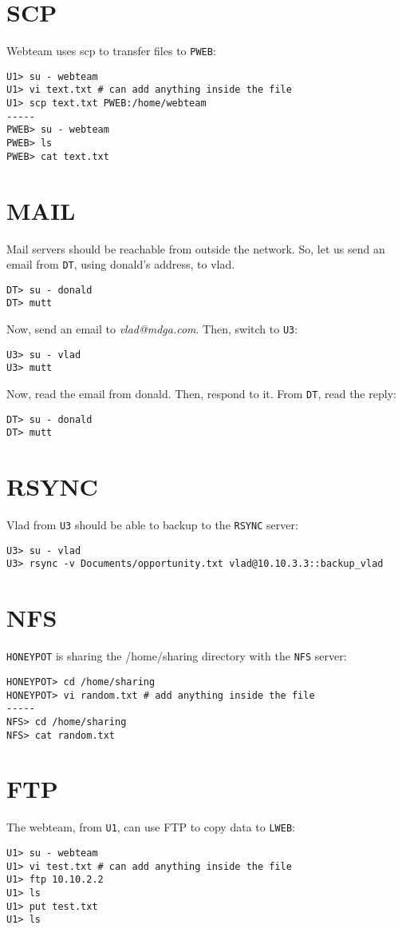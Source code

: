 \documentclass[a4paper, 11pt, oneside]{article}
\begin{document}
\section{SCP}
\noindent Webteam uses scp to transfer files to \texttt{PWEB}:
\begin{lstlisting}
U1> su - webteam
U1> vi text.txt # can add anything inside the file
U1> scp text.txt PWEB:/home/webteam
-----
PWEB> su - webteam
PWEB> ls
PWEB> cat text.txt
\end{lstlisting}

\section{MAIL}
\noindent Mail servers should be reachable from outside the network. So, let us send an email from \texttt{DT}, using donald's address, to vlad.
\begin{lstlisting}
DT> su - donald
DT> mutt
\end{lstlisting}
Now, send an email to \textit{vlad@mdga.com}. Then, switch to \texttt{U3}:
\begin{lstlisting}
U3> su - vlad
U3> mutt
\end{lstlisting}
Now, read the email from donald. Then, respond to it. From \texttt{DT}, read the reply:
\begin{lstlisting}
DT> su - donald
DT> mutt
\end{lstlisting}

\section{RSYNC}
\noindent Vlad from \texttt{U3} should be able to backup to the \texttt{RSYNC} server:
\begin{lstlisting}
U3> su - vlad
U3> rsync -v Documents/opportunity.txt vlad@10.10.3.3::backup_vlad
\end{lstlisting}

\section{NFS}
\noindent \texttt{HONEYPOT} is sharing the /home/sharing directory with the \texttt{NFS} server:
\begin{lstlisting}
HONEYPOT> cd /home/sharing
HONEYPOT> vi random.txt # add anything inside the file
-----
NFS> cd /home/sharing
NFS> cat random.txt
\end{lstlisting}

\section{FTP}
\noindent The webteam, from \texttt{U1}, can use FTP to copy data to \texttt{LWEB}:
\begin{lstlisting}
U1> su - webteam
U1> vi test.txt # can add anything inside the file
U1> ftp 10.10.2.2
U1> ls
U1> put test.txt
U1> ls
\end{lstlisting}
\end{document}
